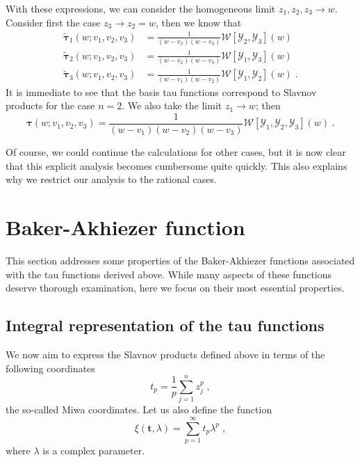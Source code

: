 \documentclass[a4paper,12pt]{amsart}
\begin{document}
With these expressions, we can consider the homogeneous limit \(z_1,
z_2, z_3 \to w\). Consider first the case \(z_3 \to z_2 = w\), then we
know that
\begin{equation}
  \begin{split}
  \tilde{\bm{\tau}}_1(w; v_1 , v_2, v_3) & = \frac{1}{(w - v_2)(w - v_3)}\mathcal{W}[\mathcal{Y}_2, \mathcal{Y}_3](w)\\
  \tilde{\bm{\tau}}_2(w; v_1 , v_2, v_3) & = \frac{1}{(w - v_2)(w - v_3)}\mathcal{W}[\mathcal{Y}_1, \mathcal{Y}_3](w)\\
  \tilde{\bm{\tau}}_3(w; v_1 , v_2, v_3) & = \frac{1}{(w - v_1)(w - v_2)}\mathcal{W}[\mathcal{Y}_1, \mathcal{Y}_2](w)
  \; .
  \end{split}
\end{equation}
It is immediate to see that the basis tau functions correspond to
Slavnov products for the case \(n=2\). We also take the limit \(z_1\to
w\); then
\begin{equation}
  \bm{\tau}(w; v_1 , v_2, v_3) = 
  \frac{1}{(w - v_1)(w - v_2)(w - v_3)} \mathcal{W}[\mathcal{Y}_1, \mathcal{Y}_2, \mathcal{Y}_3](w)\; .
\end{equation}

Of course, we could continue the calculations for other cases, but it
is now clear that this explicit analysis becomes cumbersome quite
quickly. This also explains why we restrict our analysis to the
rational cases.



\section{Baker-Akhiezer function}

This section addresses some properties of the Baker-Akhiezer functions
associated with the tau functions derived above. While many aspects of
these functions deserve thorough examination, here we focus on their
most essential properties.

\subsection{Integral representation of the tau functions}

We now aim to express the Slavnov products defined above in terms of
the following coordinates
\begin{equation}
  t_p = \frac{1}{p}\sum_{j=1}^n z_j^p\; ,
\end{equation}
the so-called Miwa coordinates. Let us also define the function
\begin{equation}
  \xi(\bm{t}, \lambda) = \sum_{p=1}^\infty t_p \lambda^p\; , 
\end{equation}
where \(\lambda\) is a complex parameter.
\end{document}

